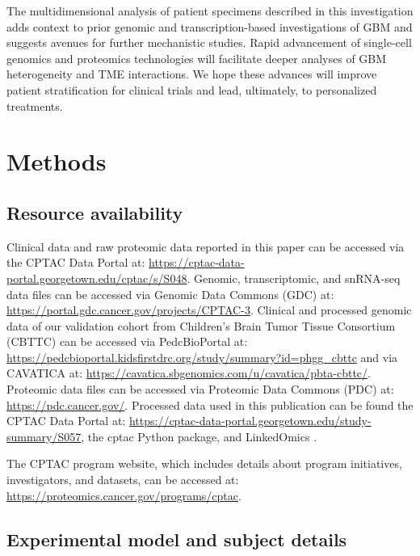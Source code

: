 The multidimensional analysis of patient specimens described in this investigation adds context to prior genomic and transcription-based investigations of GBM and suggests avenues for further mechanistic studies. Rapid advancement of single-cell genomics and proteomics technologies will facilitate deeper analyses of GBM heterogeneity and TME interactions. We hope these advances will improve patient stratification for clinical trials and lead, ultimately, to personalized treatments.



\section{Methods}
\tightlists

\subsection{Resource availability}
Clinical data and raw proteomic data reported in this paper can be accessed via the CPTAC Data Portal at: \url{https://cptac-data-portal.georgetown.edu/cptac/s/S048}. Genomic, transcriptomic, and snRNA-seq data files can be accessed via Genomic Data Commons (GDC) at: \url{https://portal.gdc.cancer.gov/projects/CPTAC-3}. Clinical and processed genomic data of our validation cohort from Children’s Brain Tumor Tissue Consortium (CBTTC) can be accessed via PedcBioPortal at: \url{https://pedcbioportal.kidsfirstdrc.org/study/summary?id=phgg_cbttc} and via CAVATICA at: \url{https://cavatica.sbgenomics.com/u/cavatica/pbta-cbttc/}. Proteomic data files can be accessed via Proteomic Data Commons (PDC) at: \url{https://pdc.cancer.gov/}. Processed data used in this publication can be found the CPTAC Data Portal at: \url{https://cptac-data-portal.georgetown.edu/study-summary/S057}, the cptac Python package, and LinkedOmics \cite{vasaikarsv_zhangb:LinkedOmicsAnalyzing2018}.

The CPTAC program website, which includes details about program initiatives, investigators, and datasets, can be accessed at: \url{https://proteomics.cancer.gov/programs/cptac}.


\subsection{Experimental model and subject details}

